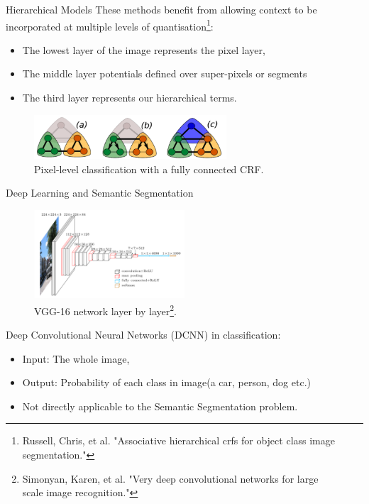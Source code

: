 \documentclass{beamer}
\begin{document}
\begin{frame}{Hierarchical Models}
These methods benefit from allowing context to be incorporated at multiple levels of quantisation\footnote{Russell, Chris, et al. "Associative hierarchical crfs for object class image segmentation."}:
\begin{itemize}
	 \item The lowest layer of the image represents the pixel layer,
	 \item The middle layer potentials defined over super-pixels or segments
	 \item The third layer represents our hierarchical terms.
\end{itemize}
\begin{figure}
	\centering
	\includegraphics[width=0.64\textwidth]{figure/ss14.png}
	\captionsetup{justification=centering}
	\caption{Pixel-level classification with a fully connected CRF.}	
\end{figure}
\end{frame}

\begin{frame}{Deep Learning and Semantic Segmentation}
\begin{figure}
	\centering
	\includegraphics[width=0.5\textwidth]{figure/ss6.png}
	\captionsetup{justification=centering}
	\caption{VGG-16 network layer by layer\footnote{Simonyan, Karen, et al. "Very deep convolutional networks for large\\scale image recognition."}.}	
\end{figure}
\vspace{-0.6cm}
Deep Convolutional Neural Networks ({\color{blue}DCNN}) in classification:
\begin{itemize}
	\item {\color{blue}Input:} The whole image,
	\item {\color{blue}Output:} Probability of each class in image(a car, person, dog etc.)
	\item<2-> Not directly applicable to the Semantic Segmentation problem.
\end{itemize}
\end{frame}
\end{document}
